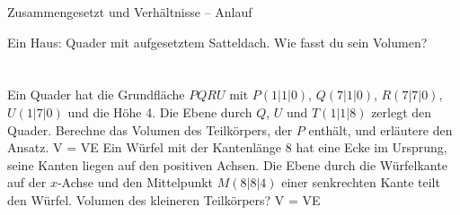 \setcounter{aufgabe}{0}

\begin{aufgabe}{Zusammengesetzt und Verhältnisse – Anlauf}
\begin{teile}
\teil Ein Haus: Quader mit aufgesetztem Satteldach. Wie fasst du sein Volumen? \\  \\  \\ 
\teil Ein Quader hat die Grundfläche $PQRU$ mit $P(1 | 1 | 0)$, $Q(7 | 1 | 0)$, $R(7 | 7 | 0)$, $U(1 | 7 | 0)$ und die Höhe 4. Die Ebene durch $Q$, $U$ und $T(1 | 1 | 8)$ zerlegt den Quader. Berechne das Volumen des Teilkörpers, der $P$ enthält, und erläutere den Ansatz. V = \leerfeld VE
\teil Ein Würfel mit der Kantenlänge 8 hat eine Ecke im Ursprung, seine Kanten liegen auf den positiven Achsen. Die Ebene durch die Würfelkante auf der $x$-Achse und den Mittelpunkt $M(8 | 8 | 4)$ einer senkrechten Kante teilt den Würfel. Volumen des kleineren Teilkörpers? V = \leerfeld VE
\end{teile}
\end{aufgabe}

